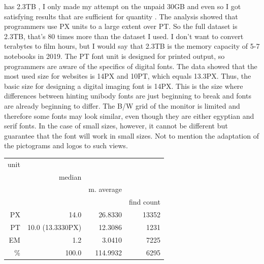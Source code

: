 \documentclass[a4paper]{article}
\begin{document}
{} has 2.3TB , I only made my attempt on the unpaid 30GB and even so I got satisfying results that are sufficient for quantity . The analysis showed that programmers use PX units to a large extent over PT. So the full dataset is 2.3TB, that's 80 times more than the dataset I used. I don't want to convert terabytes to film hours, but I would say that 2.3TB is the memory capacity of 5-7 notebooks in 2019. The PT font unit is designed for printed output, so programmers are aware of the specifics of digital fonts. The data showed that the most used size for websites is 14PX and 10PT, which equals 13.3PX. Thus, the basic size for designing a digital imaging font is 14PX. This is the size where differences between hinting unibody fonts are just beginning to break and fonts are already beginning to differ. The B/W grid of the monitor is limited and therefore some fonts may look similar, even though they are either egyptian and serif fonts. In the case of small sizes, however, it cannot be different but guarantee that the font will work in small sizes. Not to mention the adaptation of the pictograms and logos to such views.

\begin{tabular}{r | rrr}
unit & \\
& median & \\
& & m. average & \\
& & & find count \\
\midrule
PX & 14.0 & 26.8330 & 13352 \\
PT & 10.0 (13.3330PX) & 12.3086 & 1231 \\
EM & 1.2 & 3.0410 & 7225 \\
\% & 100.0 & 114.9932 & 6295 \\
\end{tabular}
\end{document}
